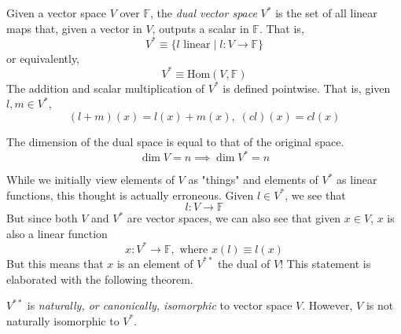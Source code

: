 \documentclass{article}
\begin{document}
    \begin{definition}
      Given a vector space $V$ over $\mathbb{F}$, the \textit{dual vector space} $V^*$ is the set of all linear maps that, given a vector in $V$, outputs a scalar in $\mathbb{F}$. That is, 
      \begin{equation}
        V^* \equiv \{ l \text{ linear} \; | \; l: V \longrightarrow \mathbb{F}\}
      \end{equation}
      or equivalently, 
      \begin{equation}
        V^* \equiv \text{Hom}(V, \mathbb{F})
      \end{equation}
      The addition and scalar multiplication of $V^*$ is defined pointwise. That is, given $l, m \in V^*$, 
      \begin{equation}
        (l + m) (x) = l(x) + m(x), \; (c l)(x) = c l(x)
      \end{equation}
    \end{definition}

    \begin{theorem}
      The dimension of the dual space is equal to that of the original space. 
      \begin{equation}
        \dim{V} = n \implies \dim{V^*} = n
      \end{equation}
    \end{theorem}

    While we initially view elements of $V$ as "things" and elements of $V^*$ as linear functions, this thought is actually erroneous. Given $l \in V^*$, we see that 
    \begin{equation}
      l: V \longrightarrow \mathbb{F}
    \end{equation}
    But since both $V$ and $V^*$ are vector spaces, we can also see that given $x \in V$, $x$ is also a linear function 
    \begin{equation}
      x: V^* \longrightarrow \mathbb{F}, \text{ where } x(l) \equiv l(x)
    \end{equation}
    But this means that $x$ is an element of $V^{**}$ the dual of $V$! This statement is elaborated with the following theorem. 

    \begin{theorem}
      $V^{**}$ is \textit{naturally, or canonically, isomorphic} to vector space $V$. However, $V$ is not naturally isomorphic to $V^*$. 
    \end{theorem}
\end{document}
